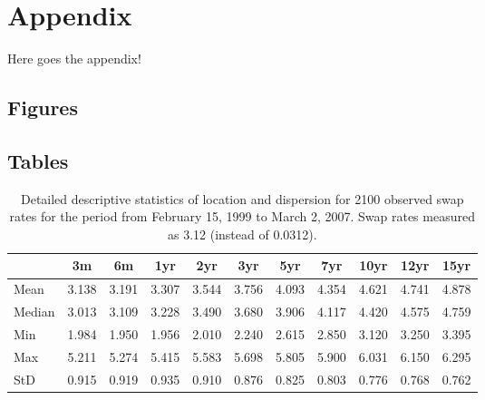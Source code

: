 \documentclass[a4paper,11pt]{article}
\begin{document}
\newpage

\appendix

\hypertarget{appendix}{%
\section{Appendix}\label{appendix}}

Here goes the appendix!

\hypertarget{figures}{%
\subsection{Figures}\label{figures}}

\hypertarget{tables}{%
\subsection{Tables}\label{tables}}
\begin{table}[ht]
    \begin{center}
        {\footnotesize
        \begin{tabular}{l|cccccccccc}
        \hline \hline
                        & 3m    & 6m    & 1yr   & 2yr   & 3yr   & 5yr   & 7yr   & 10yr  & 12yr  & 15yr   \\
            \hline
                Mean   & 3.138 & 3.191 & 3.307 & 3.544 & 3.756 & 4.093 & 4.354 & 4.621 & 4.741 & 4.878  \\
                Median & 3.013 & 3.109 & 3.228 & 3.490 & 3.680 & 3.906 & 4.117 & 4.420 & 4.575 & 4.759  \\
                Min    & 1.984 & 1.950 & 1.956 & 2.010 & 2.240 & 2.615 & 2.850 & 3.120 & 3.250 & 3.395  \\
                Max    & 5.211 & 5.274 & 5.415 & 5.583 & 5.698 & 5.805 & 5.900 & 6.031 & 6.150 & 6.295  \\
                StD    & 0.915 & 0.919 & 0.935 & 0.910 & 0.876 & 0.825 & 0.803 & 0.776 & 0.768 & 0.762  \\
            \hline \hline
        \end{tabular}}
    \end{center}
    \caption{Detailed descriptive statistics of location and dispersion for
    2100 observed swap rates for the period from
    February 15, 1999 to March 2, 2007. Swap rates measured as 3.12 (instead of 0.0312).}
    \label{tab:apptable}
\end{table}
\newpage

\end{document}
